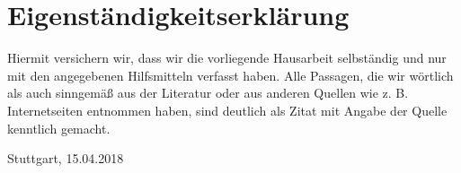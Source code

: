 

\clearpage
\section*{Eigenständigkeitserklärung}
\vspace*{2cm}
\begin{center}
	\begin{minipage}[t]{0.8\textwidth}
		Hiermit versichern wir, dass wir die vorliegende Hausarbeit selbständig und nur mit den angegebenen Hilfsmitteln verfasst haben. Alle Passagen, die wir wörtlich als auch sinngemäß aus der Literatur oder aus anderen Quellen wie z. B. Internetseiten entnommen haben, sind deutlich als Zitat mit Angabe der Quelle kenntlich gemacht.
		
		\vspace*{60mm}
		Stuttgart, 15.04.2018
	\end{minipage}
\end{center}




